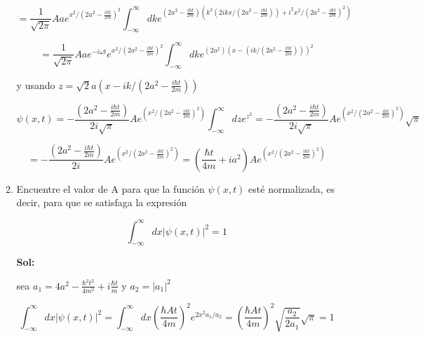 \documentclass[12pt,a4paper]{article}
\begin{document}
\begin{enumerate}
\begin{enumerate}
        \begin{equation*}
            = \frac{1}{\sqrt{2\pi}} Aa e^{x^2 /(2a^2-\frac{i\hbar t}{2m})^2} \int_{-\infty}^{\infty} dk e^{(2a^2-\frac{i\hbar t}{2m})(k^2 (2ikx/(2a^2-\frac{i\hbar t}{2m})) + i^2x^2/(2a^2-\frac{i\hbar t}{2m})^2)}
        \end{equation*}
        
        \begin{equation*}
            = \frac{1}{\sqrt{2\pi}} Aa e^{-i\omega t} e^{x^2 / (2a^2-\frac{i\hbar t}{2m})^2} \int_{-\infty}^{\infty} dk e^{(2a^2)(x-(ik/(2a^2-\frac{i\hbar t}{2m})))^2}
        \end{equation*}
        
        y usando $z =\sqrt{2}a(x-ik/(2a^2-\frac{i\hbar t}{2m})) $
        
        \begin{equation*}
            \psi(x,t) = -\frac{(2a^2- \frac{i \hbar t}{2m})}{2i\sqrt{\pi}} A e^{(x^2 / (2a^2-\frac{i\hbar t}{2m})^2)} \int_{-\infty}^{\infty} dz e^{z^2} =  -\frac{(2a^2- \frac{i \hbar t}{2m})}{2i\sqrt{\pi}} A e^{(x^2 / (2a^2-\frac{i\hbar t}{2m})^2)} \sqrt{\pi}
        \end{equation*}
        
        \begin{equation*}
            = -\frac{(2a^2- \frac{i \hbar t}{2m})}{2i} A e^{(x^2 / (2a^2-\frac{i\hbar t}{2m})^2)} = (\frac{ \hbar t}{4m}+ia^2 ) A e^{(x^2 / (2a^2-\frac{i\hbar t}{2m})^2)}
        \end{equation*}
        
        
        \item Encuentre el valor de A para que la función $\psi(x,t)$ esté normalizada, es decir, para que se satisfaga la expresión 
        
        \begin{equation*}
            \int_{-\infty}^{\infty} dx |\psi(x,t)|^2 = 1
        \end{equation*}
        
        \textbf{Sol:}
        
        sea $a_1 = 4a^2 - \frac{ \hbar^2 t^2}{4m^2} + i \frac{\hbar t}{m}$ y $a_2 = |a_1|^2$
        
        \begin{equation*}
            \int_{-\infty}^{\infty} dx |\psi(x,t)|^2  = \int_{-\infty}^{\infty} dx  \left(\frac{\hbar A t}{4m}\right)^2 e^{2x^2a_1/a_2} = \left(\frac{\hbar A t}{4m}\right)^2 \sqrt{\frac{a_2}{2 a_1}} \sqrt{\pi} = 1
        \end{equation*}
        

\end{enumerate}
\end{enumerate}
\end{document}
